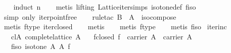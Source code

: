 \begin{isabellebody}
%
\isadelimproof
\ \ %
\endisadelimproof
%
\isatagproof
{}\isamarkupfalse%
\ {}induct\ n{}\isanewline
\ \ \isamarkupfalse%
\ {}metis\ {}lifting{}\ Lattice{}iter{}simps{}{}{}\ isotone{}def\ f{}iso{}\isanewline
\ \ \isamarkupfalse%
\ {}simp\ only{}\ iter{}pointfree{}\isanewline
\ \ \isamarkupfalse%
\ {}rule{}tac\ B\ {}\ A\ \ iso{}compose{}\isanewline
\ \ \isamarkupfalse%
\ {}metis\ f{}type\ iter{}closed{}\isanewline
\ \ \isamarkupfalse%
\ metis\isanewline
\ \ \isamarkupfalse%
\ {}metis\ f{}type{}\isanewline
\ \ \isamarkupfalse%
\ {}metis\ f{}iso{}%
\endisatagproof
{\isafoldproof}%
%
\isadelimproof
\isanewline
%
\endisadelimproof
\isanewline
{}\isamarkupfalse%
\ iter{}inc{}\isanewline
\ \ \ cl{}A{}\ {}complete{}lattice\ A{}\isanewline
\ \ \ f{}closed{}\ {}f\ {}\ carrier\ A\ {}\ carrier\ A{}\isanewline
\ \ \ f{}iso{}\ {}isotone\ A\ A\ f{}\isanewline

\end{isabellebody}
